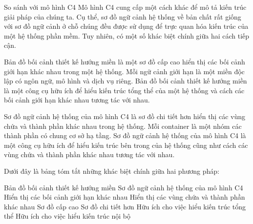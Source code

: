 So sánh với mô hình C4
Mô hình C4 cung cấp một cách khác để mô tả kiến trúc giải pháp của chúng ta. Cụ thể, sơ đồ ngữ cảnh hệ thống về bản chất rất giống với sơ đồ ngữ cảnh ở chỗ chúng đều được sử dụng để trực quan hóa kiến trúc của một hệ thống phần mềm. Tuy nhiên, có một số khác biệt chính giữa hai cách tiếp cận.

Bản đồ bối cảnh thiết kế hướng miền là một sơ đồ cấp cao hiển thị các bối cảnh giới hạn khác nhau trong một hệ thống. Mỗi ngữ cảnh giới hạn là một miền độc lập có ngôn ngữ, mô hình và dịch vụ riêng. Bản đồ bối cảnh thiết kế hướng miền là một công cụ hữu ích để hiểu kiến trúc tổng thể của một hệ thống và cách các bối cảnh giới hạn khác nhau tương tác với nhau.

Sơ đồ ngữ cảnh hệ thống của mô hình C4 là sơ đồ chi tiết hơn hiển thị các vùng chứa và thành phần khác nhau trong hệ thống. Mỗi container là một nhóm các thành phần có chung cơ sở hạ tầng. Sơ đồ ngữ cảnh hệ thống của mô hình C4 là một công cụ hữu ích để hiểu kiến trúc bên trong của hệ thống cũng như cách các vùng chứa và thành phần khác nhau tương tác với nhau.

Dưới đây là bảng tóm tắt những khác biệt chính giữa hai phương pháp:

Bản đồ bối cảnh thiết kế hướng miền 	Sơ đồ ngữ cảnh hệ thống của mô hình C4
Hiển thị các bối cảnh giới hạn khác nhau	Hiển thị các vùng chứa và thành phần khác nhau
Sơ đồ cấp cao	Sơ đồ chi tiết hơn
Hữu ích cho việc hiểu kiến trúc tổng thể	Hữu ích cho việc hiểu kiến trúc nội bộ

